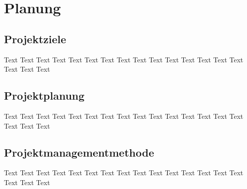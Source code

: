 \chapter{Planung}
\section{Projektziele}
Text Text Text Text Text Text Text Text Text Text Text Text Text Text Text Text Text Text
\section{Projektplanung}
Text Text Text Text Text Text Text Text Text Text Text Text Text Text Text Text Text Text
\section{Projektmanagementmethode}
Text Text Text Text Text Text Text Text Text Text Text Text Text Text Text Text Text Text
